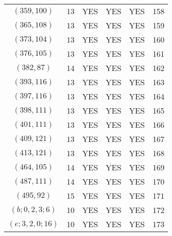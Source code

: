\begin{longtable}{|c|c|c|c|c|c|}
$(359, 100)$ & 13 & YES & YES & YES & 158\\
$(365, 108)$ & 13 & YES & YES & YES & 159\\
$(373, 104)$ & 13 & YES & YES & YES & 160\\
$(376, 105)$ & 13 & YES & YES & YES & 161\\
$(382, 87)$ & 14 & YES & YES & YES & 162\\
$(393, 116)$ & 13 & YES & YES & YES & 163\\
$(397, 116)$ & 13 & YES & YES & YES & 164\\
$(398, 111)$ & 13 & YES & YES & YES & 165\\
$(401, 111)$ & 13 & YES & YES & YES & 166\\
$(409, 121)$ & 13 & YES & YES & YES & 167\\
$(413, 121)$ & 13 & YES & YES & YES & 168\\
$(464, 105)$ & 14 & YES & YES & YES & 169\\
$(487, 111)$ & 14 & YES & YES & YES & 170\\
$(495, 92)$ & 15 & YES & YES & YES & 171\\
$(b; 0, 2, 3; 6)$ & 10 & YES & YES & YES & 172\\
$(e; 3, 2, 0; 16)$ & 10 & YES & YES & YES & 173
\end{longtable}
